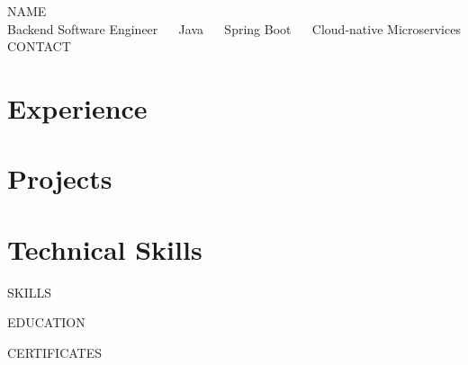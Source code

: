\documentclass[letterpaper,11pt]{article}
\newcommand{\resumeSubHeadingListStart}{\begin{itemize}[leftmargin=0.0in, label={}]}
\newcommand{\resumeSubHeadingListEnd}{\end{itemize}}
\begin{document}
\begin{center}
    {\Huge \scshape {{NAME}}} \\ \vspace{3pt}
Backend Software Engineer ~\textbar{}~ Java ~\textbar{}~ Spring Boot ~\textbar{}~ Cloud-native Microservices
\\[3pt]
    {{CONTACT}}
\end{center}
\vspace{-7pt}

\section{Experience}
\resumeSubHeadingListStart


\resumeSubHeadingListEnd
\vspace{-7pt}

\section{Projects}
\resumeSubHeadingListStart

\resumeSubHeadingListEnd
\vspace{-6pt}

\section{Technical Skills}
\begin{itemize}[leftmargin=0.15in,label={},itemsep=0pt,parsep=0pt,topsep=1pt]
\small{\item{
{{SKILLS}}
}}
\end{itemize}
\vspace{-7pt}

{{EDUCATION}}

{{CERTIFICATES}}
\end{document}
